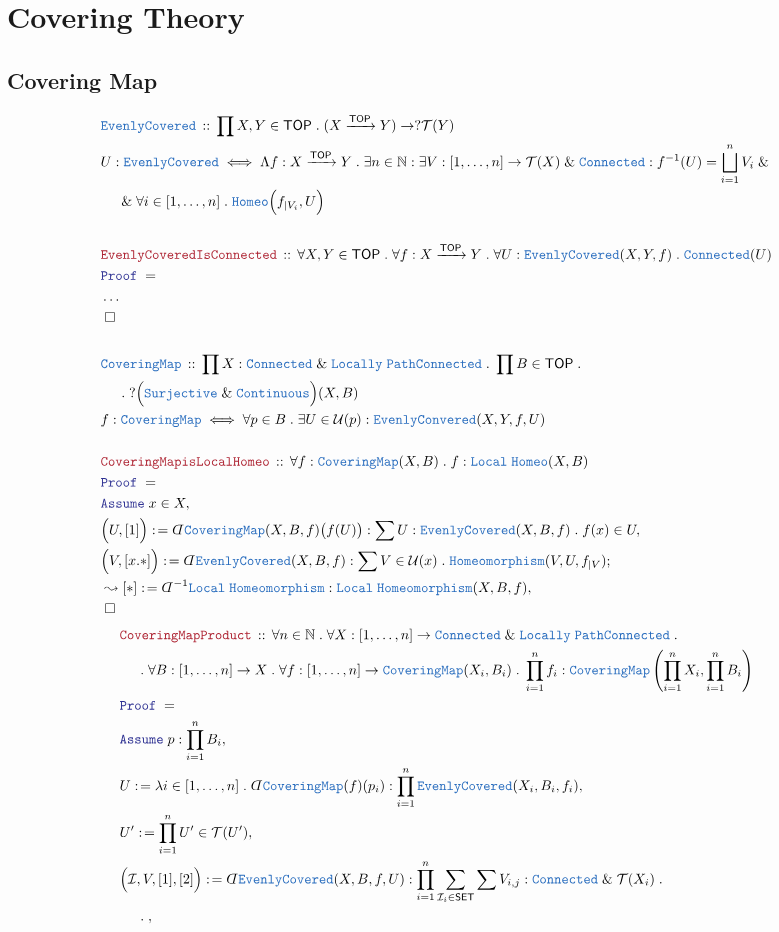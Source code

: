 \documentclass[12pt]{scrartcl}
\newcommand{\TYPE}[1]{\textcolor{NavyBlue}{\mathtt{#1}}}
\newcommand{\LOGIC}[1]{\textcolor{Blue}{\mathtt{#1}}}
\newcommand{\THM}[1]{\textcolor{Maroon}{\mathtt{#1}}}
\renewcommand{\.}{\; . \;}
\newcommand{\de}{: \kern 0.1pc =}
\newcommand{\Theorem}[2]{& \THM{#1} \, :: \, #2 \\ & \Proof = \\ }
\newcommand{\DeclareType}[2]{& \TYPE{#1} \, :: \, #2 \\}
\newcommand{\DefineType}[3]{& #1 : \TYPE{#2} \iff #3 \\}
\newcommand{\NewLine}{\\ & \kern 1pc}
\newcommand{\Page}[1]{ \begin{align*} #1 \end{align*}   }
\newcommand{ \bd }{ \ByDef }
\newcommand{\NoProof}{ & \ldots \\ \EndProof}
\renewcommand{\And}{\; \& \;}
\newcommand{\Nat}{\mathbb{N} }
\newcommand{\Arrow}{\xrightarrow}
\newcommand{\Say}[3]{& #1 \de #2 : #3, \\}
\newcommand{\SayIn}[3]{& #1 \de #2 \in #3, \\}
\newcommand{\Conclude}[3]{& #1 \de #2 : #3; \\}
\newcommand{\Derive}[3]{& \leadsto #1 \de #2 : #3, \\}
\newcommand{\Assume}[2]{& \LOGIC{Assume} \; #1 : #2, \\}
\newcommand{\AssumeIn}[2]{& \LOGIC{Assume} \; #1 \in #2, \\}
\newcommand{\QED}{\; \square}
\newcommand{\EndProof}{& \QED \\}
\newcommand{\ByDef}{\rotatebox[origin=c]{-180}{$D$}}%
\newcommand{\Proof}{\LOGIC{Proof} \; }
\newcommand{\I}{\mathcal{I}}
\newcommand{\SET}{\mathsf{SET}}
\newcommand{\TOP}{\mathsf{TOP}}
\newcommand{\T}{\mathcal{T}}
\newcommand{\U}{\mathcal{U}}
\begin{document}
\section{Covering Theory}
\subsection{Covering Map}
\Page{
	\DeclareType{EvenlyCovered}
	{
		\prod X,Y \in \TOP \.
		(X \Arrow{\TOP} Y)  \to ?\T(Y)
	}
	\DefineType{U}{EvenlyCovered}
	{
		\Lambda f : X \Arrow{\TOP} Y \.
		\exists n \in \Nat :
		\exists V : [1,\ldots,n] \to \T(X) \And \TYPE{Connected} :
		f^{-1}(U) = \bigsqcup^n_{i=1} V_i 
		\And \NewLine \And
		\forall i \in [1,\ldots,n] \. \TYPE{Homeo}\Big(f_{|V_i}, U\Big)
	}
	\\
	\Theorem{EvenlyCoveredIsConnected}
	{
		\forall X,Y \in \TOP \.
		\forall f : X \Arrow{\TOP} Y  \.
		\forall U : \TYPE{EvenlyCovered}(X,Y,f) \. 
		\TYPE{Connected}(U)
	}
	\NoProof
	\\
	\DeclareType{CoveringMap}
	{
		\prod X : \TYPE{Connected} \And \TYPE{Locally}\;\TYPE{PathConnected} \. 
		\prod B \in \TOP \. \NewLine \. 
		?\Big(\TYPE{Surjective} \And \TYPE{Continuous}\Big)(X,B)
	}
	\DefineType{f}{CoveringMap}{\forall p \in B \. \exists U \in \U(p) : \TYPE{EvenlyConvered}(X,Y,f,U)}
	\\
	\Theorem{CoveringMapisLocalHomeo}
	{
		\forall f : \TYPE{CoveringMap}(X,B) \. 
		f : \TYPE{Local} \; \TYPE{Homeo}(X,B)
	}
	\AssumeIn{x}{X}
	\Say{\Big(U,[1]\Big)}{\bd \TYPE{CoveringMap}(X,B,f)\big( f(U) \big)}
	{
		\sum U : \TYPE{EvenlyCovered}(X,B,f) \. f(x) \in U
	}
	\Conclude{\Big(V,[x.*]\Big)}{\bd \TYPE{EvenlyCovered}(X,B,f)}
	{
		\sum V \in \U(x) \.  \TYPE{Homeomorphism}(V,U, f_{|V})
	}
	\Derive{[*]}{\bd^{-1} \TYPE{Local}\;\TYPE{Homeomorphism}}
	{
		\TYPE{Local}\;\TYPE{Homeomorphism}(X,B,f)
	}
	\EndProof
}\Page{
	\Theorem{CoveringMapProduct}
	{
		\forall n \in \Nat \.
		\forall X : [1,\ldots,n] \to \TYPE{Connected} \And \TYPE{Locally}\; \TYPE{PathConnected} \. \NewLine \. 
		\forall B : [1,\ldots,n] \to X \.
		\forall f : [1,\ldots,n] \to \TYPE{CoveringMap}(X_i,B_i) \.
		\prod^n_{i=1} f_i : \TYPE{CoveringMap}\left( \prod^n_{i=1} X_i, \prod^n_{i=1} B_i \right) 
	}
	\Assume{p}{\prod^n_{i=1} B_i}
	\Say{U}{\lambda i \in [1,\ldots,n] \. \bd \TYPE{CoveringMap}(f)(p_i)}{\prod^n_{i=1} \TYPE{EvenlyCovered}(X_i,B_i,f_i)}
	\SayIn{U'}{\prod^n_{i=1} U'}{\T(U')}
	\Say{\Big(\I,V,[1],[2]\Big)}{\bd \TYPE{EvenlyCovered}(X,B,f,U)}
	{
		\prod^n_{i=1} \sum_{\I_i \in \SET} \sum V_{i,j} : \TYPE{Connected} \And \T(X_i) \. \NewLine \.  
}}
\end{document}
